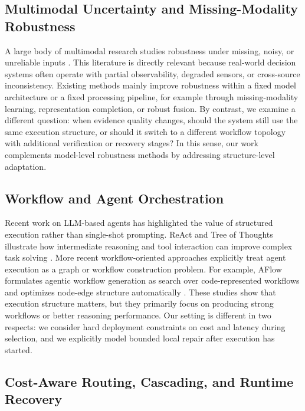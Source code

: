 \documentclass[manuscript,review,anonymous]{acmart}
\begin{document}
\subsection{Multimodal Uncertainty and Missing-Modality Robustness}

A large body of multimodal research studies robustness under missing, noisy, or unreliable inputs \cite{lan2025robust,wu2024mlmmsurvey}. This literature is directly relevant because real-world decision systems often operate with partial observability, degraded sensors, or cross-source inconsistency. Existing methods mainly improve robustness within a fixed model architecture or a fixed processing pipeline, for example through missing-modality learning, representation completion, or robust fusion. By contrast, we examine a different question: when evidence quality changes, should the system still use the same execution structure, or should it switch to a different workflow topology with additional verification or recovery stages? In this sense, our work complements model-level robustness methods by addressing structure-level adaptation.

\subsection{Workflow and Agent Orchestration}

Recent work on LLM-based agents has highlighted the value of structured execution rather than single-shot prompting. ReAct and Tree of Thoughts illustrate how intermediate reasoning and tool interaction can improve complex task solving \cite{yao2023react,yao2023tot}. More recent workflow-oriented approaches explicitly treat agent execution as a graph or workflow construction problem. For example, AFlow formulates agentic workflow generation as search over code-represented workflows and optimizes node-edge structure automatically \cite{zhang2024aflow}. These studies show that execution structure matters, but they primarily focus on producing strong workflows or better reasoning performance. Our setting is different in two respects: we consider hard deployment constraints on cost and latency during selection, and we explicitly model bounded local repair after execution has started.

\subsection{Cost-Aware Routing, Cascading, and Runtime Recovery}
\end{document}
